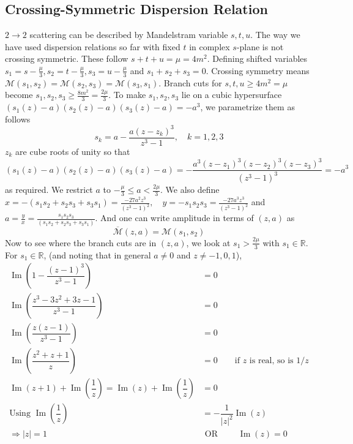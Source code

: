 ﻿\documentclass[12pt,a4paper]{article}
\begin{document}
\subsection{Crossing-Symmetric Dispersion Relation}
$2\rightarrow 2$ scattering can be described by Mandelstram variable $s,t,u$. The way we have used dispersion relations so far with fixed $t$ in complex $s$-plane is not crossing symmetric. These follow $s+t+u=\mu=4m^{2}$. Defining shifted variables $s_{1}=s-\frac{\mu}{3}, s_{2}=t-\frac{\mu}{3}, s_{3}=u-\frac{\mu}{3}$ and $s_{1}+s_{2}+s_{3}=0$. Crossing symmetry means $\mathcal{M}\left(s_{1}, s_{2}\right)=\mathcal{M}\left(s_{2}, s_{3}\right)=\mathcal{M}\left(s_{3}, s_{1}\right)$. Branch cuts for $s,t,u\geq 4m^{2}=\mu$ become $s_{1},s_{2},s_{3}\geq \frac{8m^{2}}{3}=\frac{2\mu}{3}$. To make $s_{1},s_{2},s_{3}$ lie on a cubic hypersurface $\left(s_{1}(z)-a\right)\left(s_{2}(z)-a\right)\left(s_{3}(z)-a\right)=-a^{3}$, we parametrize them as follows
$$
s_{k}=a-\frac{a\left(z-z_{k}\right)^{3}}{z^{3}-1}, \quad k=1,2,3
$$
$z_{k}$ are cube roots of unity so that
$$
\left(s_{1}(z)-a\right)\left(s_{2}(z)-a\right)\left(s_{3}(z)-a\right)=-\frac{a^{3}\left(z-z_{1}\right)^{3}\left(z-z_{2}\right)^{3}\left(z-z_{3}\right)^{3}}{(z^{3}-1)^{3}}=-a^{3}
$$
as required. We restrict $a$ to $-\frac{\mu}{3} \leq a<\frac{2 \mu}{3}$. We also define $x=-\left( s_{1} s_{2} + s_{2} s_{3} + s_{3} s_{1} \right)=\frac{-27 a^{2} z^{3}}{\left(z^{3}-1\right)^{2}}, \quad y=-s_{1} s_{2}s_{3}=\frac{-27 a^{3} z^{3}}{\left(z^{3}-1\right)^{2}}$ and  $a=\frac{y}{x}=\frac{s_{1} s_{2}s_{3}}{\left( s_{1} s_{2} + s_{2} s_{3} + s_{3} s_{1} \right)}$. And one can write amplitude in terms of $(z,a)$ as 
$$
\overline{\mathcal{M}}(z, a)=\mathcal{M}\left(s_{1}, s_{2}\right)
$$
Now to see where the branch cuts are in $(z,a)$, we look at $s_{1}>\frac{2\mu}{3}$ with $s_{1} \in \mathbb{R}$. For $s_{1} \in \mathbb{R}$, (and noting that in general $a\neq 0$ and $z\neq -1,0,1$),
$$
\begin{aligned}
\operatorname{Im}\left(1-\dfrac{(z-1)^{3}}{z^{3}-1}\right)&=0 \\
\operatorname{Im}\left(\dfrac{z^{3}-3 z^{2}+3 z-1}{z^{3}-1}\right)&=0 \\
\operatorname{Im}\left(\dfrac{z(z-1)}{z^{3}-1}\right)&=0 \\
\operatorname{Im}\left(\dfrac{z^{2}+z+1}{z}\right)&=0 \qquad \text{if $z$ is real, so is $1/z$}\\
\operatorname{Im}(z+1)+\operatorname{Im}\left(\dfrac{1}{z}\right)=\operatorname{Im}(z)+\operatorname{Im}\left(\dfrac{1}{z}\right)&=0 \\
\text{Using }\operatorname{Im}(\dfrac{1}{z})&=-\dfrac{1}{|z|^{2}}\operatorname{Im}(z)\\
\Rightarrow |z|=1 \qquad & \text{ OR } \qquad \operatorname{Im}(z)=0
\end{aligned}
$$
\end{document}
